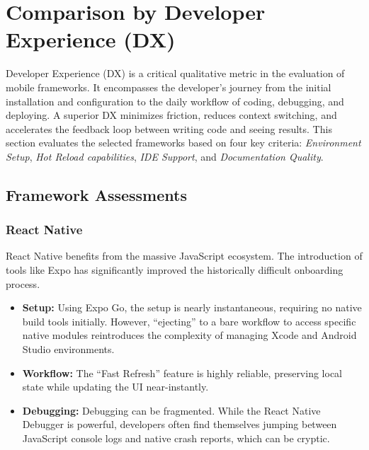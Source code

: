 \chapter{Comparison by Developer Experience (DX)}\label{chap:dx}

Developer Experience (DX) is a critical qualitative metric in the evaluation of mobile frameworks. It encompasses the developer's journey from the initial installation and configuration to the daily workflow of coding, debugging, and deploying. A superior DX minimizes friction, reduces context switching, and accelerates the feedback loop between writing code and seeing results. This section evaluates the selected frameworks based on four key criteria: \textit{Environment Setup}, \textit{Hot Reload capabilities}, \textit{IDE Support}, and \textit{Documentation Quality}.~\cite{DX:01}

\section{Framework Assessments}

\subsection{React Native}
React Native benefits from the massive JavaScript ecosystem. The introduction of tools like Expo has significantly improved the historically difficult onboarding process.
\begin{itemize}
    \item \textbf{Setup:} Using Expo Go, the setup is nearly instantaneous, requiring no native build tools initially. However, ``ejecting'' to a bare workflow to access specific native modules reintroduces the complexity of managing Xcode and Android Studio environments.
    \item \textbf{Workflow:} The ``Fast Refresh'' feature is highly reliable, preserving local state while updating the UI near-instantly.
    \item \textbf{Debugging:} Debugging can be fragmented. While the React Native Debugger is powerful, developers often find themselves jumping between JavaScript console logs and native crash reports, which can be cryptic.~\cite{DX:RN:02}
\end{itemize}


